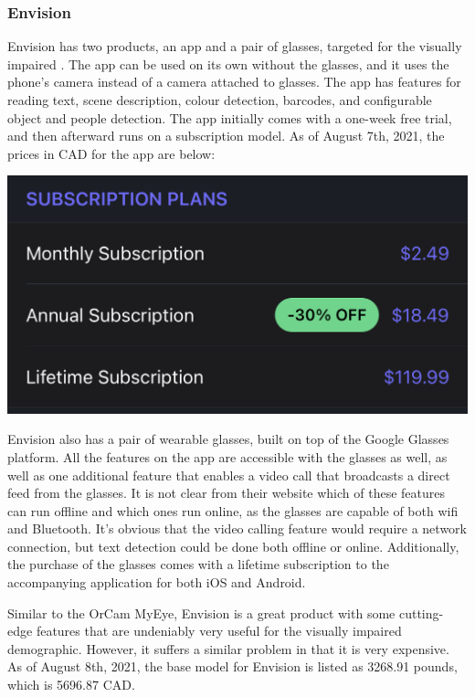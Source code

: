 \documentclass[a4paper,11pt]{article}
\begin{document}
\subsubsection{Envision}
Envision has two products, an app and a pair of glasses, targeted for the visually impaired \cite{envision}. The app can be used on its own without the glasses, and it uses the phone's camera instead of a camera attached to glasses. The app has features for reading text, scene description, colour detection, barcodes, and configurable object and people detection. The app initially comes with a one-week free trial, and then afterward runs on a subscription model. As of August 7th, 2021, the prices in CAD for the app are below:
\begin{center}
    \includegraphics[width={0.7\linewidth}]{img/envision_app_price.jpeg}
\end{center}

Envision also has a pair of wearable glasses, built on top of the Google Glasses platform. All the features on the app are accessible with the glasses as well, as well as one additional feature that enables a video call that broadcasts a direct feed from the glasses. It is not clear from their website which of these features can run offline and which ones run online, as the glasses are capable of both wifi and Bluetooth. It's obvious that the video calling feature would require a network connection, but text detection could be done both offline or online. Additionally, the purchase of the glasses comes with a lifetime subscription to the accompanying application for both iOS and Android.

Similar to the OrCam MyEye, Envision is a great product with some cutting-edge features that are undeniably very useful for the visually impaired demographic. However, it suffers a similar problem in that it is very expensive. As of August 8th, 2021, the base model for Envision is listed as 3268.91 pounds, which is 5696.87 CAD.
\end{document}
